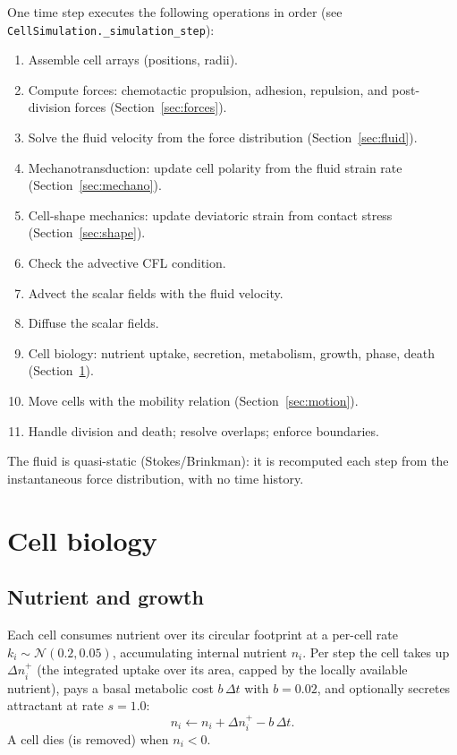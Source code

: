 \documentclass[11pt]{article}
\newcommand{\dt}{\Delta t}
\begin{document}
One time step executes the following operations in order
(see \texttt{CellSimulation.\_simulation\_step}):
\begin{enumerate}
  \item Assemble cell arrays (positions, radii).
  \item Compute forces: chemotactic propulsion, adhesion, repulsion, and
        post-division forces (Section~\ref{sec:forces}).
  \item Solve the fluid velocity from the force distribution
        (Section~\ref{sec:fluid}).
  \item[3b.] Mechanotransduction: update cell polarity from the fluid strain
        rate (Section~\ref{sec:mechano}).
  \item[3c.] Cell-shape mechanics: update deviatoric strain from contact stress
        (Section~\ref{sec:shape}).
  \item Check the advective CFL condition.
  \item Advect the scalar fields with the fluid velocity.
  \item Diffuse the scalar fields.
  \item Cell biology: nutrient uptake, secretion, metabolism, growth, phase,
        death (Section~\ref{sec:biology}).
  \item Move cells with the mobility relation (Section~\ref{sec:motion}).
  \item Handle division and death; resolve overlaps; enforce boundaries.
\end{enumerate}
The fluid is quasi-static (Stokes/Brinkman): it is recomputed each step from the
instantaneous force distribution, with no time history.

\section{Cell biology}\label{sec:biology}

\subsection{Nutrient and growth}
Each cell consumes nutrient over its circular footprint at a per-cell rate
$k_i \sim \mathcal{N}(0.2, 0.05)$, accumulating internal nutrient $n_i$. Per step
the cell takes up $\Delta n_i^{+}$ (the integrated uptake over its area, capped
by the locally available nutrient), pays a basal metabolic cost
$b\,\dt$ with $b=0.02$, and optionally secretes attractant at rate $s=1.0$:
\begin{equation}
  n_i \leftarrow n_i + \Delta n_i^{+} - b\,\dt .
\end{equation}
A cell dies (is removed) when $n_i < 0$.
\end{document}
